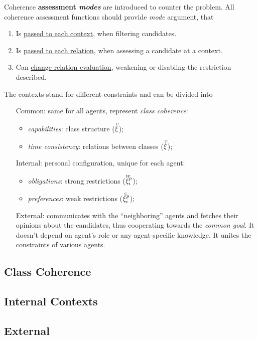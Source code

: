 \documentclass[../ThesisDoc]{subfiles}
\begin{document}
Coherence \textbf{assessment \emph{modes}} are introduced to counter the problem.
All coherence assessment functions should provide \emph{mode} argument, that
\begin{enumerate}
  \item Is \underline{passed to each context}, when filtering candidates.
  \item Is \underline{passed to each relation}, when assessing a candidate at a context.
  \item Can \underline{change relation evaluation}, weakening or disabling the
        restriction described.
\end{enumerate}

\bigskip

\noindent
The contexts stand for different constraints and can be divided into
\begin{itemize}[leftmargin=2cm]
  \item[Common:] same for all agents, represent \emph{class coherence}:
    \begin{itemize}
      \item \emph{capabilities}: class structure ($\accentset{C}{\xi}$);
      \item \emph{time consistency}: relations between classes ($\accentset{T}{\xi}$);
    \end{itemize}
  \item[Internal:] personal configuration, unique for each agent:
    \begin{itemize}
      \item \emph{obligations}: strong restrictions ($\accentset{W}{\xi}^p_i$);
      \item \emph{preferences}: weak restrictions ($\accentset{S}{\xi}^p_i$);
    \end{itemize}
  \item[External:] communicates with the ``neighboring'' agents and fetches
    their opinions about the candidates, thus cooperating towards the
    \emph{common goal}. It doesn't depend on agent's role or
      any agent-specific knowledge. It unites the constraints of various agents.
\end{itemize}


\subsection{Class Coherence}

\subsection{Internal Contexts}

\subsection{External}

\end{document}
